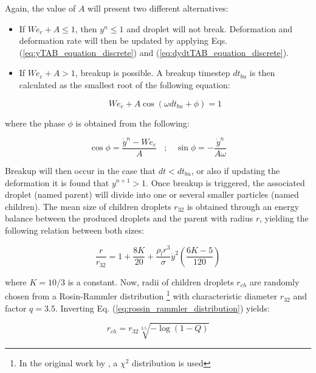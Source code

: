 Again, the value of $A$ will present two different alternatives:

\begin{itemize}

	\item If $We_c + A \leq 1$, then $y^n \leq 1$ and droplet will not break. Deformation and deformation rate will then be updated by applying Eqs. (\ref{eq:yTAB_equation_discrete}) and (\ref{eq:dydtTAB_equation_discrete}).
	
	\item If $We_c + A > 1$, breakup is possible. A breakup timestep $dt_{bu}$ is then calculated as the smallest root of the following equation:
	
	\begin{equation}
	\label{eq:TAB_dtbu_obtention}
	We_c + A \cos \left( \omega dt_{bu} + \phi  \right) = 1
	\end{equation}

\end{itemize}

where the phase $\phi$ is obtained from the following:

\begin{equation}
\cos \phi = \frac{\dot{y}^n - We_c}{A} ~~~~ ; ~~~~ \sin \phi = - \frac{\dot{y}^n}{A \omega}
\end{equation}

Breakup will then occur in the case that $dt < dt_{bu}$, or also if updating the deformation it is found that $y^{n+1} > 1$. Once breakup is triggered, the associated droplet (named parent) will divide into one or several smaller particles (named children). The mean size of children droplets $r_{32}$ is obtained through an energy balance between the produced droplets and the parent with radius $r$, yielding the following relation between both sizes:

\begin{equation}
\label{eq:TAB_model_radius_ratio}
\frac{r}{r_{32}} = 1 + \frac{8 K}{20} + \frac{\rho_l r^3}{\sigma} \dot{y}^2 \left( \frac{6 K - 5}{120} \right)
\end{equation}

where $K = 10/3$ is a constant. Now, radii of children droplets $r_{ch}$ are randomly chosen from a Rosin-Rammler distribution \footnote{In the original work by , a $\chi^2$ distribution is used} with characteristic diameter $r_{32}$ and factor $q = 3.5$. Inverting Eq. (\ref{eq:rossin_rammler_distribution}) yields:

\begin{equation}
r_{ch} = r_{32} \sqrt[3.5]{- \log \left( 1 - Q \right) }
\end{equation}


